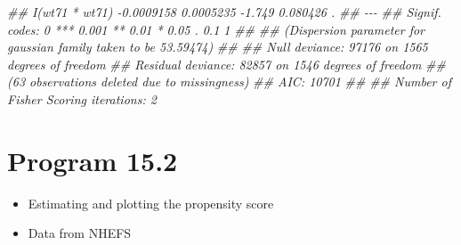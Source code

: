 \documentclass[
  10pt,
  a4paper,
]{book}
\newenvironment{Shaded}{\begin{snugshade}}{\end{snugshade}}
\newcommand{\DocumentationTok}[1]{\textcolor[rgb]{0.37,0.37,0.37}{\textit{#1}}}
\providecommand{\tightlist}{%
  \setlength{\itemsep}{0pt}\setlength{\parskip}{0pt}}
\begin{document}
\begin{Shaded}
\begin{Highlighting}[]
\DocumentationTok{\#\# I(wt71 * wt71)                     {-}0.0009158  0.0005235  {-}1.749 0.080426 .  }
\DocumentationTok{\#\# {-}{-}{-}}
\DocumentationTok{\#\# Signif. codes:  0 \textquotesingle{}***\textquotesingle{} 0.001 \textquotesingle{}**\textquotesingle{} 0.01 \textquotesingle{}*\textquotesingle{} 0.05 \textquotesingle{}.\textquotesingle{} 0.1 \textquotesingle{} \textquotesingle{} 1}
\DocumentationTok{\#\# }
\DocumentationTok{\#\# (Dispersion parameter for gaussian family taken to be 53.59474)}
\DocumentationTok{\#\# }
\DocumentationTok{\#\#     Null deviance: 97176  on 1565  degrees of freedom}
\DocumentationTok{\#\# Residual deviance: 82857  on 1546  degrees of freedom}
\DocumentationTok{\#\#   (63 observations deleted due to missingness)}
\DocumentationTok{\#\# AIC: 10701}
\DocumentationTok{\#\# }
\DocumentationTok{\#\# Number of Fisher Scoring iterations: 2}
\end{Highlighting}
\end{Shaded}

\hypertarget{program-15.2}{%
\section{Program 15.2}\label{program-15.2}}

\begin{itemize}
\tightlist
\item
  Estimating and plotting the propensity score
\item
  Data from NHEFS
\end{itemize}
\end{document}

